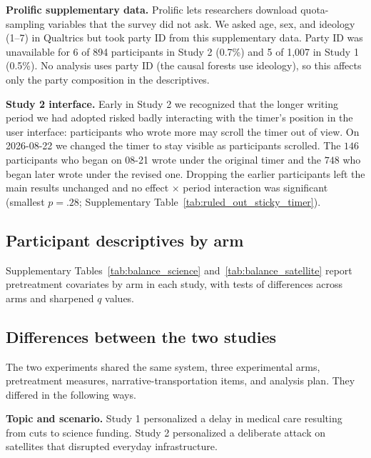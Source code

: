 \documentclass[11pt]{article}
\begin{document}
\textbf{Prolific supplementary data.} Prolific lets researchers download quota-sampling variables that the survey did not ask. We asked age, sex, and ideology (1--7) in Qualtrics but took party ID from this supplementary data. Party ID was unavailable for 6 of 894 participants in Study 2 (0.7\%) and 5 of 1{,}007 in Study 1 (0.5\%). No analysis uses party ID (the causal forests use ideology), so this affects only the party composition in the descriptives.


\textbf{Study 2 interface.} Early in Study 2 we recognized that the longer writing period we had adopted risked badly interacting with the timer's position in the user interface: participants who wrote more may scroll the timer out of view. On 2026-08-22 we changed the timer to stay visible as participants scrolled. The $146$ participants who began on 08-21 wrote under the original timer and the $748$ who began later wrote under the revised one. Dropping the earlier participants left the main results unchanged and no effect $\times$ period interaction was significant (smallest $p = .28$; Supplementary Table~\ref{tab:ruled_out_sticky_timer}).

{\footnotesize

}

\subsection{Participant descriptives by arm}
\label{sec:si-descriptives}
Supplementary Tables~\ref{tab:balance_science} and~\ref{tab:balance_satellite} report pretreatment covariates by arm in each study, with tests of differences across arms and sharpened $q$ values.

\begingroup
\footnotesize


\endgroup

\subsection{Differences between the two studies}
\label{sec:si-study-differences}

The two experiments shared the same system, three experimental arms, pretreatment measures, narrative-transportation items, and analysis plan. They differed in the following ways.

\textbf{Topic and scenario.} Study 1 personalized a delay in medical care resulting from cuts to science funding. Study 2 personalized a deliberate attack on satellites that disrupted everyday infrastructure.
\end{document}
